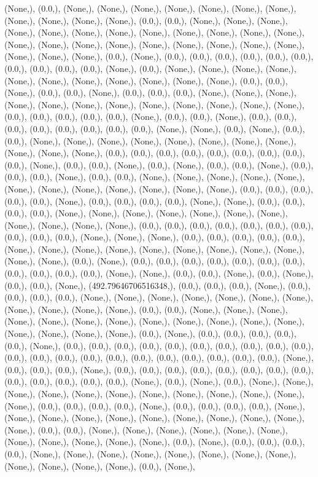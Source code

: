 \documentclass{article}
\begin{document}
(None,), (0.0,), (None,), (None,), (None,), (None,), (None,), (None,), (None,), (None,), (None,), (None,), (None,), (0.0,), (0.0,), (None,), (None,), (None,), (None,), (None,), (None,), (None,), (None,), (None,), (None,), (None,), (None,), (None,), (None,), (None,), (None,), (None,), (None,), (None,), (None,), (None,), (None,), (None,), (None,), (0.0,), (None,), (0.0,), (0.0,), (0.0,), (0.0,), (0.0,), (0.0,), (0.0,), (0.0,), (0.0,), (0.0,), (None,), (0.0,), (None,), (None,), (None,), (None,), (None,), (None,), (None,), (None,), (None,), (None,), (None,), (0.0,), (0.0,), (None,), (0.0,), (0.0,), (None,), (0.0,), (0.0,), (0.0,), (None,), (None,), (None,), (None,), (None,), (None,), (None,), (None,), (None,), (None,), (None,), (None,), (0.0,), (0.0,), (0.0,), (0.0,), (0.0,), (None,), (0.0,), (0.0,), (None,), (0.0,), (0.0,), (0.0,), (0.0,), (0.0,), (0.0,), (0.0,), (0.0,), (None,), (None,), (0.0,), (None,), (0.0,), (0.0,), (None,), (None,), (None,), (None,), (None,), (None,), (None,), (None,), (None,), (None,), (None,), (0.0,), (0.0,), (0.0,), (0.0,), (0.0,), (0.0,), (0.0,), (0.0,), (0.0,), (None,), (0.0,), (0.0,), (None,), (0.0,), (None,), (0.0,), (0.0,), (None,), (0.0,), (0.0,), (0.0,), (None,), (0.0,), (0.0,), (None,), (None,), (None,), (None,), (None,), (None,), (None,), (None,), (None,), (None,), (None,), (None,), (0.0,), (0.0,), (0.0,), (0.0,), (0.0,), (None,), (0.0,), (0.0,), (0.0,), (0.0,), (None,), (None,), (0.0,), (0.0,), (0.0,), (0.0,), (None,), (None,), (None,), (None,), (None,), (None,), (None,), (None,), (None,), (None,), (None,), (0.0,), (0.0,), (0.0,), (0.0,), (0.0,), (0.0,), (0.0,), (0.0,), (0.0,), (0.0,), (None,), (None,), (None,), (0.0,), (0.0,), (0.0,), (0.0,), (0.0,), (None,), (None,), (None,), (None,), (None,), (None,), (None,), (None,), (None,), (None,), (None,), (0.0,), (None,), (0.0,), (0.0,), (0.0,), (0.0,), (0.0,), (0.0,), (0.0,), (0.0,), (0.0,), (0.0,), (0.0,), (None,), (None,), (0.0,), (0.0,), (None,), (0.0,), (None,), (0.0,), (0.0,), (None,), (492.79646706516348,), (0.0,), (0.0,), (0.0,), (None,), (0.0,), (0.0,), (0.0,), (0.0,), (None,), (None,), (None,), (None,), (None,), (None,), (None,), (None,), (None,), (None,), (None,), (0.0,), (0.0,), (None,), (None,), (None,), (None,), (None,), (None,), (None,), (None,), (None,), (None,), (None,), (None,), (None,), (None,), (None,), (None,), (0.0,), (None,), (0.0,), (0.0,), (0.0,), (0.0,), (0.0,), (None,), (0.0,), (0.0,), (0.0,), (0.0,), (0.0,), (0.0,), (0.0,), (0.0,), (0.0,), (0.0,), (0.0,), (0.0,), (0.0,), (0.0,), (0.0,), (0.0,), (0.0,), (0.0,), (0.0,), (0.0,), (0.0,), (None,), (0.0,), (0.0,), (0.0,), (None,), (0.0,), (0.0,), (0.0,), (0.0,), (0.0,), (0.0,), (0.0,), (0.0,), (0.0,), (0.0,), (0.0,), (0.0,), (0.0,), (None,), (0.0,), (None,), (0.0,), (None,), (None,), (None,), (None,), (None,), (None,), (None,), (None,), (None,), (None,), (None,), (None,), (0.0,), (0.0,), (0.0,), (0.0,), (None,), (0.0,), (0.0,), (0.0,), (0.0,), (None,), (None,), (None,), (None,), (None,), (None,), (None,), (None,), (None,), (None,), (None,), (0.0,), (0.0,), (None,), (None,), (None,), (None,), (None,), (None,), (None,), (None,), (None,), (None,), (None,), (0.0,), (None,), (0.0,), (0.0,), (0.0,), (0.0,), (None,), (None,), (None,), (None,), (None,), (None,), (None,), (None,), (None,), (None,), (None,), (None,), (0.0,), (None,), 
\end{document}
